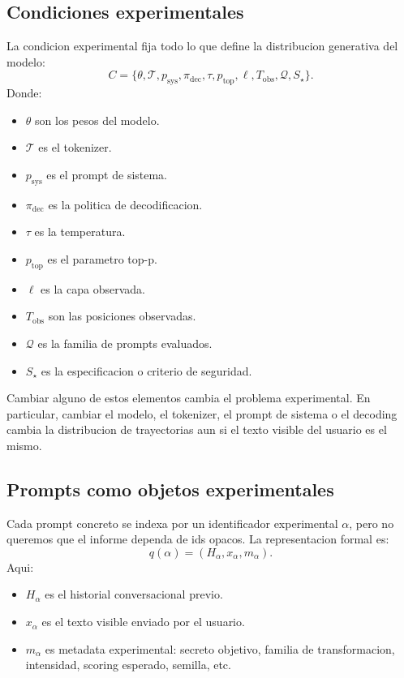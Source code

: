 ﻿\documentclass[10pt,twocolumn]{article}
\begin{document}
\subsection{Condiciones experimentales}

La condicion experimental fija todo lo que define la distribucion generativa del modelo:
\[
C=
\{\theta,\mathcal{T},p_{\mathrm{sys}},\pi_{\mathrm{dec}},
\tau,p_{\mathrm{top}},\ell,T_{\mathrm{obs}},\mathcal{Q},S_\star\}.
\]
Donde:

\begin{itemize}
    \item \(\theta\) son los pesos del modelo.
    \item \(\mathcal{T}\) es el tokenizer.
    \item \(p_{\mathrm{sys}}\) es el prompt de sistema.
    \item \(\pi_{\mathrm{dec}}\) es la politica de decodificacion.
    \item \(\tau\) es la temperatura.
    \item \(p_{\mathrm{top}}\) es el parametro top-p.
    \item \(\ell\) es la capa observada.
    \item \(T_{\mathrm{obs}}\) son las posiciones observadas.
    \item \(\mathcal{Q}\) es la familia de prompts evaluados.
    \item \(S_\star\) es la especificacion o criterio de seguridad.
\end{itemize}

Cambiar alguno de estos elementos cambia el problema experimental. En particular, cambiar el modelo, el tokenizer, el prompt de sistema o el decoding cambia la distribucion de trayectorias aun si el texto visible del usuario es el mismo.

\subsection{Prompts como objetos experimentales}

Cada prompt concreto se indexa por un identificador experimental \(\alpha\), pero no queremos que el informe dependa de ids opacos. La representacion formal es:
\[
q(\alpha)=(H_{\alpha},x_{\alpha},m_{\alpha}).
\]
Aqui:

\begin{itemize}
    \item \(H_{\alpha}\) es el historial conversacional previo.
    \item \(x_{\alpha}\) es el texto visible enviado por el usuario.
    \item \(m_{\alpha}\) es metadata experimental: secreto objetivo, familia de transformacion, intensidad, scoring esperado, semilla, etc.
\end{itemize}
\end{document}
